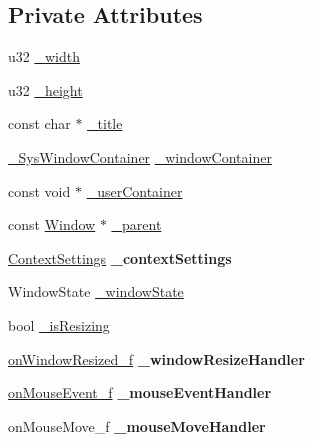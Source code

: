 \subsection*{Private Attributes}
\begin{DoxyCompactItemize}
\item 
u32 \mbox{\hyperlink{class_window_af019aa4d8f873000e1970f1e767bb5e4}{\+\_\+width}}
\item 
u32 \mbox{\hyperlink{class_window_aaa83baf1f913b498d57cc1ff58b872c0}{\+\_\+height}}
\item 
const char $\ast$ \mbox{\hyperlink{class_window_a452e9568dc406269180adbf31360ef74}{\+\_\+title}}
\item 
\mbox{\hyperlink{struct___sys_window_container}{\+\_\+\+Sys\+Window\+Container}} \mbox{\hyperlink{class_window_a1c6d0c1750d8bd3f6d34d966d53e4696}{\+\_\+window\+Container}}
\item 
const void $\ast$ \mbox{\hyperlink{class_window_a23e83496dec6b6ec76cb6a194d818796}{\+\_\+user\+Container}}
\item 
const \mbox{\hyperlink{class_window}{Window}} $\ast$ \mbox{\hyperlink{class_window_ae3b7f41531e0e9dc71e5b1e2381a6123}{\+\_\+parent}}
\item 
\mbox{\label{class_window_ac012c3920d86b12f924075eb285a8001}} 
\mbox{\hyperlink{struct_context_settings}{Context\+Settings}} {\bfseries \+\_\+context\+Settings}
\item 
Window\+State \mbox{\hyperlink{class_window_a43c5622f0faf50873784dceb427e4e4f}{\+\_\+window\+State}}
\item 
bool \mbox{\hyperlink{class_window_a09e7ef3b8eadc8eb251447132997fc6b}{\+\_\+is\+Resizing}}
\item 
\mbox{\label{class_window_a991c23d5739e2d69121650485e9285f4}} 
\mbox{\hyperlink{_window_8hpp_ada6d9541330d61d26fa6ba699a2d27ca}{on\+Window\+Resized\+\_\+f}} {\bfseries \+\_\+window\+Resize\+Handler}
\item 
\mbox{\label{class_window_a74374a7848ad07fc35f833c0279e3b46}} 
\mbox{\hyperlink{_window_8hpp_ab1aedf6a053ebea9af5d50b0888dcedd}{on\+Mouse\+Event\+\_\+f}} {\bfseries \+\_\+mouse\+Event\+Handler}
\item 
\mbox{\label{class_window_a5105786903589e50010dfdf8d98a3c9d}} 
on\+Mouse\+Move\+\_\+f {\bfseries \+\_\+mouse\+Move\+Handler}
\end{DoxyCompactItemize}
